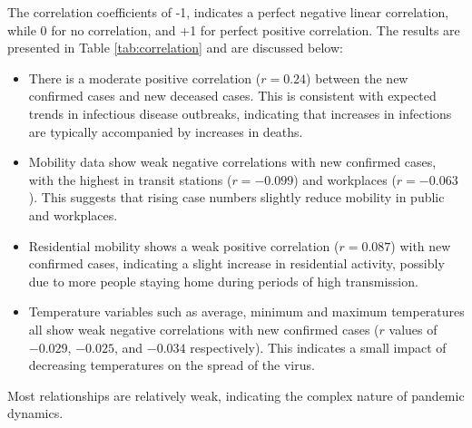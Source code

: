 \documentclass[sigconf,screen,nonacm]{acmart}
\begin{document}
The correlation coefficients of -1, indicates a perfect negative linear correlation, while 0 for no correlation, and +1 for perfect positive correlation. The results are presented in Table \ref{tab:correlation} and are discussed below:

\begin{itemize}
    \item There is a moderate positive correlation ($r=0.24$) between the new confirmed cases and new deceased cases. This is consistent with expected trends in infectious disease outbreaks, indicating that increases in infections are typically accompanied by increases in deaths.
    \item Mobility data show weak negative correlations with new confirmed cases, with the highest in transit stations ($r=-0.099$) and workplaces ($r=-0.063$). This suggests that rising case numbers slightly reduce mobility in public and workplaces.
    \item Residential mobility shows a weak positive correlation ($r=0.087$) with new confirmed cases, indicating a slight increase in residential activity, possibly due to more people staying home during periods of high transmission.
    \item Temperature variables such as average, minimum and maximum temperatures all show weak negative correlations with new confirmed cases ($r$ values of $-0.029$, $-0.025$, and $-0.034$ respectively). This indicates a small impact of decreasing temperatures on the spread of the virus.
\end{itemize}

Most relationships are relatively weak, indicating the complex nature of pandemic dynamics.
\end{document}
